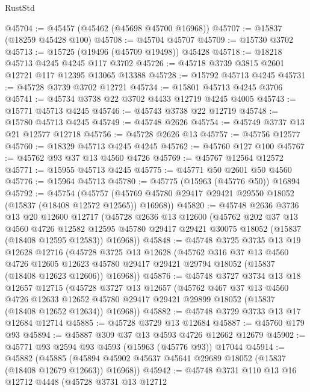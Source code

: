 \begin{lexlean}{RustStd}
\begin{coremodule}
{\begin{coremodule}
{{{{{{{{{{{{{{{{{{{{{{{{{{{{{{{{{{{{{{{{{{{{{{{{{{{{{{{{{{{{@45704 := @45457 (@45462 (@45698 @45700 @16968))
@45707 := @15837 (@18259 @45428 @100)
@45708 := @45704 @45707
@45709 := @15730 @3702
@45713 := @15725 (@19496 (@45709 @19498)) @45428
@45718 := @18218 @45713 @4245 @4245 @117 @3702
@45726 := @45718 @3739 @3815 @2601 @12721 @117 @12395 @13065 @13388
@45728 := @15792 @45713 @4245
@45731 := @45728 @3739 @3702 @12721
@45734 := @15801 @45713 @4245 @3706
@45741 := @45734 @3738 @22 @3702 @4433 @12719 @4245 @4005
@45743 := @15771 @45713 @4245
@45746 := @45743 @3738 @22 @12719
@45748 := @15780 @45713 @4245
@45749 := @45748 @2626
@45754 := @45749 @3737 @13 @21 @12577 @12718
@45756 := @45728 @2626 @13
@45757 := @45756 @12577
@45760 := @18329 @45713 @4245 @4245
@45762 := @45760 @127 @100
@45767 := @45762 @93 @37 @13 @4560 @4726
@45769 := @45767 @12564 @12572
@45771 := @15955 @45713 @4245
@45775 := @45771 @50 @2601 @50 @4560
@45776 := @15964 @45713
@45780 := @45775 (@15963 (@45776 @50)) @16894
@45792 := @45754
    (@45757 (@45769 @45780 @29417 @29421 @29550 @18052 (@15837 (@18408 @12572 @12565)) @16968))
@45820 := @45748
    @2636
    @3736
    @13
    @20
    @12600
    @12717
    (@45728
      @2636
      @13
      @12600
      (@45762
        @202
        @37
        @13
        @4560
        @4726
        @12582
        @12595
        @45780
        @29417
        @29421
        @30075
        @18052
        (@15837 (@18408 @12595 @12583))
        @16968))
@45848 := @45748
    @3725
    @3735
    @13
    @19
    @12628
    @12716
    (@45728
      @3725
      @13
      @12628
      (@45762
        @316
        @37
        @13
        @4560
        @4726
        @12605
        @12623
        @45780
        @29417
        @29421
        @29794
        @18052
        (@15837 (@18408 @12623 @12606))
        @16968))
@45876 := @45748
    @3727
    @3734
    @13
    @18
    @12657
    @12715
    (@45728
      @3727
      @13
      @12657
      (@45762
        @467
        @37
        @13
        @4560
        @4726
        @12633
        @12652
        @45780
        @29417
        @29421
        @29899
        @18052
        (@15837 (@18408 @12652 @12634))
        @16968))
@45882 := @45748 @3729 @3733 @13 @17 @12684 @12714
@45885 := @45728 @3729 @13 @12684
@45887 := @45760 @179 @93
@45894 := @45887 @309 @37 @13 @4593 @4726 @12662 @12679
@45902 := @45771 @93 @2594 @93 @4593 (@15963 (@45776 @93)) @17044
@45914 := @45882
    (@45885 (@45894 @45902 @45637 @45641 @29689 @18052 (@15837 (@18408 @12679 @12663)) @16968))
@45942 := @45748
    @3731
    @110
    @13
    @16
    @12712
    @4448
    (@45728
      @3731
      @13
      @12712
}}}}}}}}}}}}}}}}}}}}}}}}}}}}}}}}}}}}}}}}}}}}}}}}}}}}}}}}}}}}
\end{coremodule}}
\end{coremodule}
\end{lexlean}
